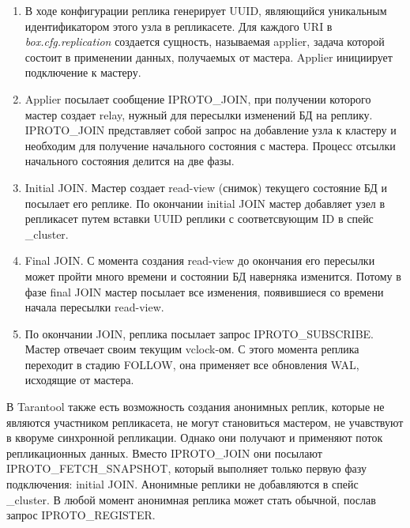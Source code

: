 \begin{enumerate}
    \item В ходе конфигурации реплика генерирует UUID, являющийся уникальным идентификатором этого узла в репликасете. Для каждого URI в \textit{box.cfg.replication} создается сущность, называемая applier, задача которой состоит в применении данных, получаемых от мастера. Applier инициирует подключение к мастеру.
    \item Applier посылает сообщение IPROTO\_JOIN, при получении которого мастер создает relay, нужный для пересылки изменений БД на реплику. IPROTO\_JOIN представляет собой запрос на добавление узла к кластеру и необходим для получение начального состояния с мастера. Процесс отсылки начального состояния делится на две фазы.
    \item Initial JOIN. Мастер создает read-view (снимок) текущего состояние БД и посылает его реплике. По окончании initial JOIN мастер добавляет узел в репликасет путем вставки UUID реплики с соответсвующим ID в спейс \_cluster.
    \item Final JOIN. С момента создания read-view до окончания его пересылки может пройти много времени и состоянии БД наверняка изменится. Потому в фазе final JOIN мастер посылает все изменения, появившиеся со времени начала пересылки read-view.
    \item По окончании JOIN, реплика посылает запрос IPROTO\_SUBSCRIBE. Мастер отвечает своим текущим vclock-ом. С этого момента реплика переходит в стадию FOLLOW, она применяет все обновления WAL, исходящие от мастера.
\end{enumerate}

В Tarantool также есть возможность создания анонимных реплик, которые не являются участником репликасета, не могут становиться мастером, не учавствуют в кворуме синхронной репликации. Однако они получают и применяют поток репликационных данных. Вместо IPROTO\_JOIN они посылают IPROTO\_FETCH\_SNAPSHOT, который выполняет только первую фазу подключения: initial JOIN. Анонимные реплики не добавляются в спейс \_cluster. В любой момент анонимная реплика может стать обычной, послав запрос IPROTO\_REGISTER.
